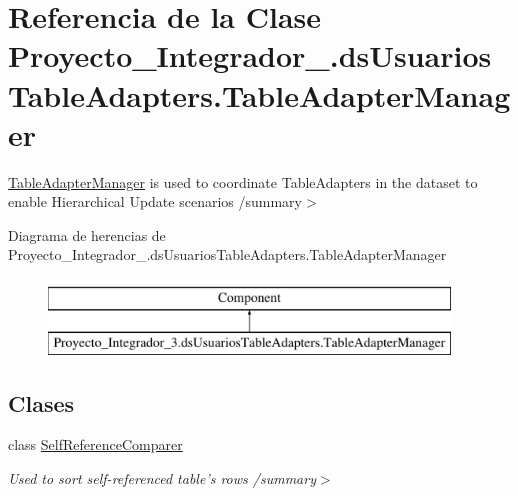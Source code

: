 \hypertarget{class_proyecto___integrador__3_1_1ds_usuarios_table_adapters_1_1_table_adapter_manager}{\section{Referencia de la Clase Proyecto\-\_\-\-Integrador\-\_.\-ds\-Usuarios\-Table\-Adapters.\-Table\-Adapter\-Manager}
\label{class_proyecto___integrador__3_1_1ds_usuarios_table_adapters_1_1_table_adapter_manager}
}


\hyperlink{class_proyecto___integrador__3_1_1ds_usuarios_table_adapters_1_1_table_adapter_manager}{Table\-Adapter\-Manager} is used to coordinate Table\-Adapters in the dataset to enable Hierarchical Update scenarios /summary$>$  


Diagrama de herencias de Proyecto\-\_\-\-Integrador\-\_.\-ds\-Usuarios\-Table\-Adapters.\-Table\-Adapter\-Manager\begin{figure}[H]
\begin{center}
\leavevmode
\includegraphics[height=2.000000cm]{class_proyecto___integrador__3_1_1ds_usuarios_table_adapters_1_1_table_adapter_manager}
\end{center}
\end{figure}
\subsection*{Clases}
\begin{DoxyCompactItemize}
\item 
class \hyperlink{class_proyecto___integrador__3_1_1ds_usuarios_table_adapters_1_1_table_adapter_manager_1_1_self_reference_comparer}{Self\-Reference\-Comparer}
\begin{DoxyCompactList}\small\item\em Used to sort self-\/referenced table's rows /summary$>$ \end{DoxyCompactList}\end{DoxyCompactItemize}
